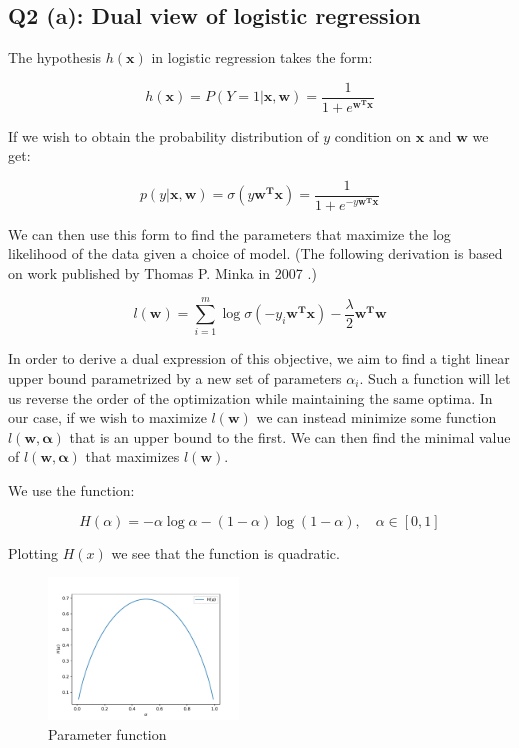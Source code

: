 \documentclass[11pt]{amsart}
\newcommand{\vek}[1]{\mathbf{#1}}
\begin{document}
\subsection{Q2 (a): Dual view of logistic regression}

The hypothesis $h(\vek{x})$ in logistic regression takes the form:

\begin{equation}
h(\vek{x}) = P(Y=1 \vert \vek{x}, \vek{w}) = \frac{1}{1 + e^{\vek{w^T}\vek{x}}}
\end{equation}

If we wish to obtain the probability distribution of $y$ condition on $\vek{x}$ and $\vek{w}$ we get:

\begin{equation}
p(y \vert \vek{x}, \vek{w}) = \sigma(y\vek{w^T}\vek{x}) = \frac{1}{1 + e^{-y\vek{w^T}\vek{x}}}
\end{equation}

We can then use this form to find the parameters that maximize the log likelihood of the data given a choice of model. (The following derivation is based on work published by Thomas P. Minka in 2007 \cite{minka2003comparison}.)

\begin{equation}
l(\vek{w}) = \sum_{i=1}^{m} \log\sigma(-y_i\vek{w^T}\vek{x}) - \frac{\lambda}{2}\vek{w^T}\vek{w}
\end{equation}

In order to derive a dual expression of this objective, we aim to find a tight linear upper bound parametrized by a new set of parameters $\alpha_{i}$. Such a function will let us reverse the order of the optimization while maintaining the same optima. In our case, if we wish to maximize $l(\vek{w})$ we can instead minimize some function $l(\vek{w}, \vek{\alpha})$ that is an upper bound to the first. We can then find the minimal value of $l(\vek{w}, \vek{\alpha})$ that maximizes $l(\vek{w})$.

We use the function:

\begin{equation}
H(\alpha) = -\alpha\log\alpha - (1-\alpha)\log(1-\alpha), \quad \alpha \in [0, 1]
\end{equation}

Plotting $H(x)$ we see that the function is quadratic.

\begin{figure}[h]
	\centering
	\includegraphics[width=0.45\textwidth]{H_x.pdf}
	\caption{Parameter function}
\end{figure}
\end{document}
